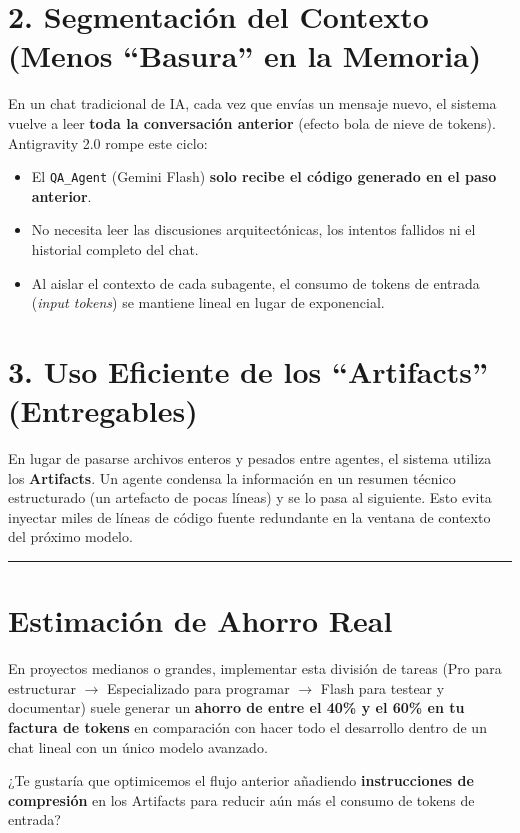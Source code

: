\documentclass[12pt, a4paper]{article}
\begin{document}
\section*{2. Segmentación del Contexto (Menos ``Basura'' en la Memoria)}

En un chat tradicional de IA, cada vez que envías un mensaje nuevo, el sistema vuelve a leer \textbf{toda la conversación anterior} (efecto bola de nieve de tokens). Antigravity 2.0 rompe este ciclo:

\begin{itemize}
    \item El \texttt{QA\_Agent} (Gemini Flash) \textbf{solo recibe el código generado en el paso anterior}.
    \item No necesita leer las discusiones arquitectónicas, los intentos fallidos ni el historial completo del chat.
    \item Al aislar el contexto de cada subagente, el consumo de tokens de entrada (\textit{input tokens}) se mantiene lineal en lugar de exponencial.
\end{itemize}

\section*{3. Uso Eficiente de los ``Artifacts'' (Entregables)}

En lugar de pasarse archivos enteros y pesados entre agentes, el sistema utiliza los \textbf{Artifacts}. Un agente condensa la información en un resumen técnico estructurado (un artefacto de pocas líneas) y se lo pasa al siguiente. Esto evita inyectar miles de líneas de código fuente redundante en la ventana de contexto del próximo modelo.

\noindent\rule{\textwidth}{0.4pt}

\section*{Estimación de Ahorro Real}

En proyectos medianos o grandes, implementar esta división de tareas (Pro para estructurar $\rightarrow$ Especializado para programar $\rightarrow$ Flash para testear y documentar) suele generar un \textbf{ahorro de entre el 40\% y el 60\% en tu factura de tokens} en comparación con hacer todo el desarrollo dentro de un chat lineal con un único modelo avanzado.

¿Te gustaría que optimicemos el flujo anterior añadiendo \textbf{instrucciones de compresión} en los Artifacts para reducir aún más el consumo de tokens de entrada?
\end{document}
